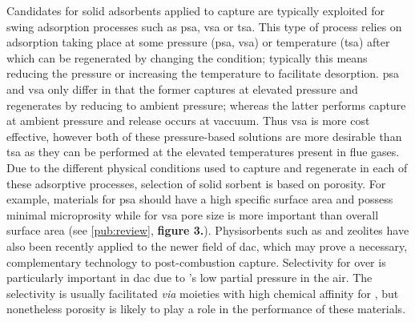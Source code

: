 Candidates for solid \glspl{adsorbent} applied to  capture are typically exploited for swing adsorption processes such as \acrfull{psa}, \acrfull{vsa} or \acrfull{tsa}. This type of process relies on \gls{adsorption} taking place at some pressure (\acrshort{psa}, \acrshort{vsa}) or temperature (\acrshort{tsa}) after which  can be regenerated by changing the condition; typically this means reducing the pressure or increasing the temperature to facilitate desorption.\citep{bahamon2018energetic, hedin2013adsorbents, Zhao2018Synthesis, adewole2013current, ho2008reducing}  \acrshort{psa} and \acrshort{vsa} only differ in that the former captures  at elevated pressure and regenerates by reducing to ambient pressure; whereas the latter performs capture at ambient pressure and release occurs at vaccuum. Thus \acrshort{vsa} is more cost effective, however both of these pressure-based solutions are more desirable than \acrshort{tsa} as they can be performed at the elevated temperatures present in flue gases.\citep{ho2008reducing, adewole2013current, Pirngruber2013} Due to the different physical conditions used to capture and regenerate  in each of these adsorptive processes, selection of solid sorbent is based on porosity. For example, materials for \acrshort{psa} should have a high specific surface area and possess minimal microprosity while for \acrshort{vsa} pore size is more important than overall surface area (see \ref{pub:review}, \textbf{figure 3.}).\citep{ho2008reducing, Chou2004, Presser2011Effect} Physisorbents such as  and zeolites have also been recently applied to the newer field of \acrfull{dac}, which may prove a necessary, complementary technology to post-combustion capture.\citep{kumar2015direct, mcqueen2021review, deutz2021life} Selectivity for  over  is particularly important in \acrshort{dac} due to 's low partial pressure in the air. The selectivity is usually facilitated \textit{via} moieties with high chemical affinity for , but nonetheless porosity is likely to play a role in the performance of these materials.\citep{kumar2015direct, darunte2016direct, deng2021comparative}

